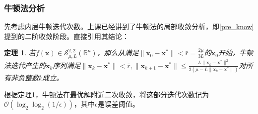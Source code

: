 \documentclass{article}
\newtheorem{thm}{定理}
\begin{document}
\subsubsection{牛顿法分析}
先考虑内层牛顿迭代次数。上课已经讲到了牛顿法的局部收敛分析，即\ref{pre_know}提到的二阶收敛阶段。直接引用其结论：
\begin{thm}
    \label{newton_converge}
    若$f(\bm x)\in\mathcal{S}_{\mu,L}^{2,2}(\mathbb{R}^n)$，那么从满足$\|\bm x_0-\bm x^*\|<\bar r=\frac{2\mu}{3L}$的$\bm x_0$开始，牛顿法迭代产生的{$\bm x_k$}序列满足$\|\bm x_k-\bm x^*\|<\bar r,\|\bm x_{k+1}-\bm x^*\|\le \frac{L\|\bm x_k-\bm x^*\|^2}{2(\mu-L\|\bm x_k-\bm x^*\|)}$对所有非负整数$k$成立。
\end{thm}
根据定理\ref{newton_converge}，牛顿法在最优解附近二次收敛，将这部分迭代次数记为$\mathcal O(\log_2\log_2(1/\epsilon))$，其中$\epsilon$是误差阈值。
\end{document}
